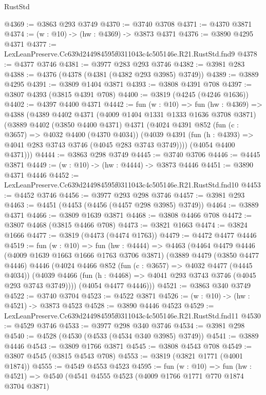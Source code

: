 \begin{lexlean}{RustStd}
\begin{coremodule}
@4369 := @3863 @293 @3749
@4370 := @3740 @3708
@4371 := @4370 @3871
@4374 := (w : @10) -> (hw : @4369) -> @3873 @4371
@4376 := @3890 @4295 @4371
@4377 := LexLeanPreserve.Cc639d244984595f0311043c4c505146e.R21.RustStd.fnd9
@4378 := @4377 @3746
@4381 := @3977 @283 @293 @3746
@4382 := @3981 @283
@4388 := @4376 (@4378 (@4381 (@4382 @293 @3985) @3749))
@4389 := @3889 @4295
@4391 := @3809 @1404 @3871
@4393 := @3808 @4391 @708
@4397 := @3807 @4393 (@3815 @4391 @708)
@4400 := @3819 (@4245 (@4246 @1636))
@4402 := @4397 @4400 @4371
@4442 := fun (w : @10) =>
  fun (hw : @4369) =>
  @4388
    (@4389
      @4402
      @4371
      (@4009 @1404 @1331 @1333 @1636 @3708 @3871)
      (@3889
        @4402
        (@3850 @4400 @4371)
        @4371
        (@4024
          @4391
          @852
          (fun (c : @3657) => @4032 @4400 (@4370 @4034))
          (@4039 @4391 (fun (h : @4393) => @4041 @283 @3743 @3746 (@4045 @283 @3743 @3749))))
        (@4054 @4400 @4371)))
@4444 := @3863 @298 @3749
@4445 := @3740 @3706
@4446 := @4445 @3871
@4449 := (w : @10) -> (hw : @4444) -> @3873 @4446
@4451 := @3890 @4371 @4446
@4452 := LexLeanPreserve.Cc639d244984595f0311043c4c505146e.R21.RustStd.fnd10
@4453 := @4452 @3746
@4456 := @3977 @293 @298 @3746
@4457 := @3981 @293
@4463 := @4451 (@4453 (@4456 (@4457 @298 @3985) @3749))
@4464 := @3889 @4371
@4466 := @3809 @1639 @3871
@4468 := @3808 @4466 @708
@4472 := @3807 @4468 (@3815 @4466 @708)
@4473 := @3821 @1663
@4474 := @3824 @1666
@4477 := @3819 (@4473 (@4474 @1763))
@4479 := @4472 @4477 @4446
@4519 := fun (w : @10) =>
  fun (hw : @4444) =>
  @4463
    (@4464
      @4479
      @4446
      (@4009 @1639 @1663 @1666 @1763 @3706 @3871)
      (@3889
        @4479
        (@3850 @4477 @4446)
        @4446
        (@4024
          @4466
          @852
          (fun (c : @3657) => @4032 @4477 (@4445 @4034))
          (@4039 @4466 (fun (h : @4468) => @4041 @293 @3743 @3746 (@4045 @293 @3743 @3749))))
        (@4054 @4477 @4446)))
@4521 := @3863 @340 @3749
@4522 := @3740 @3704
@4523 := @4522 @3871
@4526 := (w : @10) -> (hw : @4521) -> @3873 @4523
@4528 := @3890 @4446 @4523
@4529 := LexLeanPreserve.Cc639d244984595f0311043c4c505146e.R21.RustStd.fnd11
@4530 := @4529 @3746
@4533 := @3977 @298 @340 @3746
@4534 := @3981 @298
@4540 := @4528 (@4530 (@4533 (@4534 @340 @3985) @3749))
@4541 := @3889 @4446
@4543 := @3809 @1766 @3871
@4545 := @3808 @4543 @708
@4549 := @3807 @4545 (@3815 @4543 @708)
@4553 := @3819 (@3821 @1771 (@4001 @1874))
@4555 := @4549 @4553 @4523
@4595 := fun (w : @10) =>
  fun (hw : @4521) =>
  @4540
    (@4541
      @4555
      @4523
      (@4009 @1766 @1771 @770 @1874 @3704 @3871)

\end{coremodule}
\end{lexlean}
